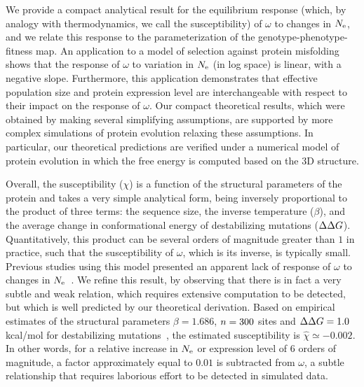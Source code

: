 \documentclass{article}
\begin{document}
We provide a compact analytical result for the equilibrium response (which, by analogy with thermodynamics, we call the susceptibility) of $\omega$ to changes in $N_{\text{e}}$, and we relate this response to the parameterization of the genotype-phenotype-fitness map.
An application to a model of selection against protein misfolding shows that the response of $\omega$ to variation in $N_{\text{e}}$ (in log space) is linear, with a negative slope.
Furthermore, this application demonstrates that {effective population size} and protein expression level are interchangeable with respect to their impact on the response of $\omega$.
Our compact theoretical results, which were obtained by making several simplifying assumptions, are supported by more complex simulations of protein evolution relaxing these assumptions.
In particular, our theoretical predictions are verified under a numerical model of protein evolution in which the free energy is computed based on the 3D structure.

Overall, the susceptibility ($\chi$) is a function of the structural parameters of the protein and takes a very simple analytical form, being inversely proportional to the product of three terms: the sequence size, the inverse temperature ($\beta$), and the average change in conformational energy of destabilizing mutations ($\Delta \Delta G$).
Quantitatively, this product can be several orders of magnitude greater than $1$ in practice, such that the susceptibility of $\omega$, which is its inverse, is typically small.
Previous studies using this model presented an apparent lack of response of $\omega$ to changes in $N_{\text{e}}$~\citep{Goldstein2013}.
We refine this result, by observing that there is in fact a very subtle and weak relation, which requires extensive computation to be detected, but which is well predicted by our theoretical derivation.
Based on empirical estimates of the structural parameters $\beta = 1.686$, $n=300$ sites and $\Delta \Delta G = 1.0$ kcal/mol for destabilizing mutations~\citep{Zeldovich2007}, the estimated susceptibility is $\hat{\chi} \simeq -0.002$.
In other words, for a relative increase in $N_{\text{e}}$ or expression level of $6$ orders of magnitude, a factor approximately equal to $0.01$ is subtracted from $\omega$, a subtle relationship that requires laborious effort to be detected in simulated data.
\end{document}
